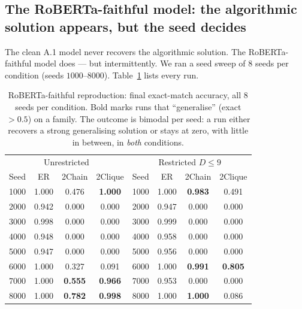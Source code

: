 \documentclass[11pt,a4paper]{article}
\begin{document}
\subsection{The RoBERTa-faithful model: the algorithmic solution appears, but
the seed decides}
\label{sec:repro-rob}

The clean A.1 model never recovers the algorithmic solution. The RoBERTa-faithful
model does --- but intermittently. We ran a seed sweep of $8$ seeds per condition
(seeds $1000$--$8000$). Table~\ref{tab:repro-rob} lists every run.

\begin{table}[H]
\centering
\small
\begin{tabular}{cccc|cccc}
\toprule
\multicolumn{4}{c|}{Unrestricted} & \multicolumn{4}{c}{Restricted $D \le 9$} \\
Seed & ER & 2Chain & 2Clique & Seed & ER & 2Chain & 2Clique \\
\midrule
1000 & 1.000 & 0.476 & \textbf{1.000} & 1000 & 1.000 & \textbf{0.983} & 0.491 \\
2000 & 0.942 & 0.000 & 0.000 & 2000 & 0.947 & 0.000 & 0.000 \\
3000 & 0.998 & 0.000 & 0.000 & 3000 & 0.999 & 0.000 & 0.000 \\
4000 & 0.948 & 0.000 & 0.000 & 4000 & 0.958 & 0.000 & 0.000 \\
5000 & 0.947 & 0.000 & 0.000 & 5000 & 0.956 & 0.000 & 0.000 \\
6000 & 1.000 & 0.327 & 0.091 & 6000 & 1.000 & \textbf{0.991} & \textbf{0.805} \\
7000 & 1.000 & \textbf{0.555} & \textbf{0.966} & 7000 & 0.953 & 0.000 & 0.000 \\
8000 & 1.000 & \textbf{0.782} & \textbf{0.998} & 8000 & 1.000 & \textbf{1.000} & 0.086 \\
\bottomrule
\end{tabular}
\caption{RoBERTa-faithful reproduction: final exact-match accuracy, all $8$ seeds
per condition. Bold marks runs that ``generalise'' (exact $> 0.5$) on a family.
The outcome is bimodal per seed: a run either recovers a strong generalising
solution or stays at zero, with little in between, in \emph{both} conditions.}
\label{tab:repro-rob}
\end{table}
\end{document}
